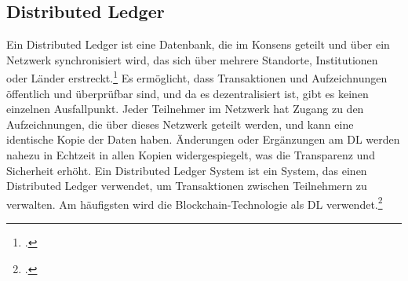 \subsection{Distributed Ledger}
\label{sec:definition-distributed-ledger}
Ein Distributed Ledger ist eine Datenbank, die im Konsens geteilt und über ein Netzwerk synchronisiert wird, das sich über mehrere Standorte, Institutionen oder Länder erstreckt.\footcite[Vgl. hierzu und zum Folgenden][]{w1,w2} 
Es ermöglicht, dass Transaktionen und Aufzeichnungen öffentlich und überprüfbar sind, und da es dezentralisiert ist, gibt es keinen einzelnen Ausfallpunkt. 
Jeder Teilnehmer im Netzwerk hat Zugang zu den Aufzeichnungen, die über dieses Netzwerk geteilt werden, und kann eine identische Kopie der Daten haben. Änderungen oder Ergänzungen am DL werden nahezu in Echtzeit in allen Kopien widergespiegelt, was die Transparenz und Sicherheit erhöht.
\bigbreak
\noindent
Ein Distributed Ledger System ist ein System, das einen Distributed Ledger verwendet, um Transaktionen zwischen Teilnehmern zu verwalten. Am häufigsten wird die Blockchain-Technologie als DL verwendet.\footcite[Vgl.][]{w3}